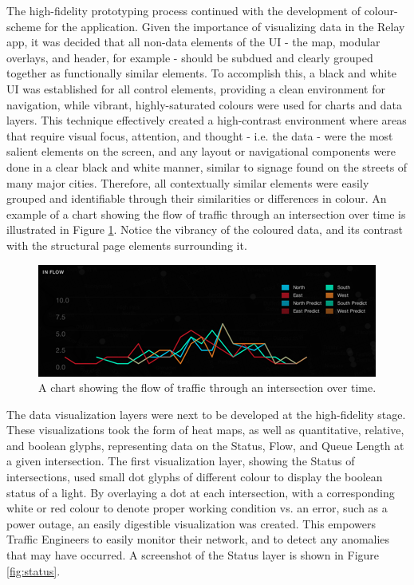 \documentclass{report}
\begin{document}
The high-fidelity prototyping process continued with the development of colour-scheme for the application.
Given the importance of visualizing data in the Relay app, it was decided that all non-data elements of the UI - the map, modular overlays, and header, for example - should be subdued and clearly grouped together as functionally similar elements.
To accomplish this, a black and white UI was established for all control elements, providing a clean environment for navigation, while vibrant, highly-saturated colours were used for charts and data layers.
This technique effectively created a high-contrast environment where areas that require visual focus, attention, and thought - i.e. the data - were the most salient elements on the screen, and any layout or navigational components were done in a clear black and white manner, similar to signage found on the streets of many major cities.
Therefore, all contextually similar elements were easily grouped and identifiable through their similarities or differences in colour.
An example of a chart showing the flow of traffic through an intersection over time is illustrated in Figure \ref{fig:chart}.
Notice the vibrancy of the coloured data, and its contrast with the structural page elements surrounding it. \\

\begin{figure}[htbp!]
  \begin{centering}
    \includegraphics[scale=0.9]{figures/chart.png}
    \caption{A chart showing the flow of traffic through an intersection over time.}
    \label{fig:chart}
  \end{centering}
\end{figure}

The data visualization layers were next to be developed at the high-fidelity stage.
These visualizations took the form of heat maps, as well as quantitative, relative, and boolean glyphs, representing data on the Status, Flow, and Queue Length at a given intersection.
The first visualization layer, showing the Status of intersections, used small dot glyphs of different colour to display the boolean status of a light.
By overlaying a dot at each intersection, with a corresponding white or red colour to denote proper working condition vs. an error, such as a power outage, an easily digestible visualization was created.
This empowers Traffic Engineers to easily monitor their network, and to detect any anomalies that may have occurred.
A screenshot of the Status layer is shown in Figure \ref{fig:status}. \\
\end{document}
